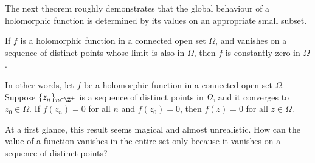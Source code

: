 \documentclass[thmcnt=section, color=cyan, 12pt]{my-elegantbook}
\begin{document}
The next theorem roughly demonstrates that the global behaviour of a holomorphic function is determined by its values on an appropriate small subset.

\begin{theorem}
    If $f$ is a holomorphic function in a connected open set $\Omega$, and vanishes on a sequence of distinct points whose limit is also in $\Omega$, then $f$ is constantly zero in $\Omega$.

    In other words, let $f$ be a holomorphic function in a connected open set $\Omega$.
    Suppose $\{z_n\}_{n \in \Z^+}$ is a sequence of distinct points in $\Omega$, and it converges to $z_0 \in \Omega$. If $f(z_n) = 0$ for all $n$ and $f(z_0) = 0$, then $f(z) = 0$ for all $z \in \Omega$.
\end{theorem}

At a first glance, this result seems magical and almost unrealistic.
How can the value of a function vanishes in the entire set only because it vanishes on a sequence of distinct points?
\end{document}
